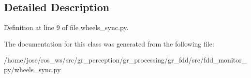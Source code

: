 \subsection{Detailed Description}


Definition at line 9 of file wheels\+\_\+sync.\+py.



The documentation for this class was generated from the following file\+:\begin{DoxyCompactItemize}
\item 
/home/jose/ros\+\_\+ws/src/gr\+\_\+perception/gr\+\_\+processing/gr\+\_\+fdd/src/fdd\+\_\+monitor\+\_\+py/wheels\+\_\+sync.\+py\end{DoxyCompactItemize}
